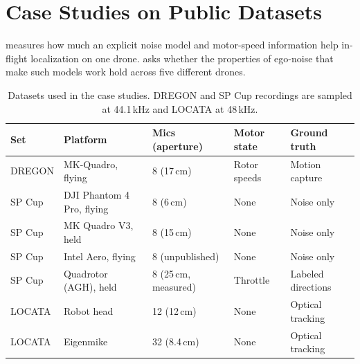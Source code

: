 \section{Case Studies on Public Datasets}
\label{sec:case}

 measures how much an explicit noise model and motor-speed information help in-flight localization on one drone.
 asks whether the properties of ego-noise that make such models work hold across five different drones.

\begin{table}[t]
\centering
\footnotesize
\setlength{\tabcolsep}{6pt}
\begin{tabular}{@{}lllll@{}}
\toprule
Set & Platform & Mics (aperture) & Motor state & Ground truth \\
\midrule
DREGON & MK-Quadro, flying & 8 (17\,cm) & Rotor speeds & Motion capture \\
SP Cup & DJI Phantom 4 Pro, flying & 8 (6\,cm) & None & Noise only \\
SP Cup & MK Quadro V3, held & 8 (15\,cm) & None & Noise only \\
SP Cup & Intel Aero, flying & 8 (unpublished) & None & Noise only \\
SP Cup & Quadrotor (AGH), held & 8 (25\,cm, measured) & Throttle & Labeled directions \\
LOCATA & Robot head & 12 (12\,cm) & None & Optical tracking \\
LOCATA & Eigenmike & 32 (8.4\,cm) & None & Optical tracking \\
\bottomrule
\end{tabular}
\caption{Datasets used in the case studies. DREGON and SP Cup recordings are sampled at 44.1\,kHz and LOCATA at 48\,kHz.}
\label{tab:casedata}
\end{table}

